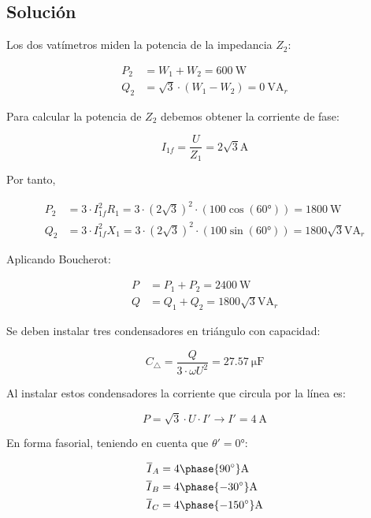 \subsection*{Solución}

Los dos vatímetros miden la potencia de la impedancia $Z_2$:

\begin{align*}
  P_2 &= W_1 + W_2 = \SI{600}{\watt}\\
  Q_2 &= \sqrt{3}\cdot (W_1 - W_2) = \SI{0}{\volt\ampere_r}
\end{align*}

Para calcular la potencia de $Z_2$ debemos obtener la corriente de fase:

\[
  I_{1f} = \frac{U}{Z_1} = {2\sqrt{3}}\unit{\ampere}
\]

Por tanto,

\begin{align*}
  P_2 &= 3 \cdot I_{1f}^2 R_1 = 3 \cdot (2\sqrt{3})^2 \cdot (100\cos(\ang{60})) = \SI{1800}{\watt}\\
  Q_2 &= 3 \cdot I_{1f}^2 X_1 = 3 \cdot (2\sqrt{3})^2 \cdot (100\sin(\ang{60})) = {1800\sqrt{3}}\unit{\volt\ampere_r}
\end{align*}

Aplicando Boucherot:

\begin{align*}
  P &= P_1 + P_2 = \SI{2400}{\watt}\\
  Q &= Q_1 + Q_2 = {1800\sqrt{3}}\unit{\volt\ampere_r}
\end{align*}

Se deben instalar tres condensadores en triángulo con capacidad:

\[
  C_\triangle = \frac{Q}{3 \cdot \omega U^2} = \SI{27.57}{\micro\farad}
\]

Al instalar estos condensadores la corriente que circula por la línea es:

\[
  P = \sqrt{3} \cdot U \cdot I' \rightarrow I' = \SI{4}{\ampere}
\]

En forma fasorial, teniendo en cuenta que $\theta' = \ang{0}$:

\begin{align*}
  \overline{I}_A &= {4\phase{\ang{90}}}\unit{\ampere}\\
  \overline{I}_B &= {4\phase{\ang{-30}}}\unit{\ampere}\\
  \overline{I}_C &= {4\phase{\ang{-150}}}\unit{\ampere}
\end{align*}





